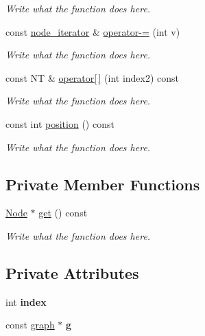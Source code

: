 \begin{DoxyCompactItemize}
\begin{DoxyCompactList}\small\item\em Write what the function does here. \end{DoxyCompactList}\item 
const \hyperlink{classgraph_1_1node__iterator}{node\+\_\+iterator} \& \hyperlink{classgraph_1_1node__iterator_af155e6e177ee131be5af6fed46133f03}{operator-\/=} (int v)
\begin{DoxyCompactList}\small\item\em Write what the function does here. \end{DoxyCompactList}\item 
const N\+T \& \hyperlink{classgraph_1_1node__iterator_ad725e0ed27e4bd369a42d5db8eabcc47}{operator\mbox{[}$\,$\mbox{]}} (int index2) const 
\begin{DoxyCompactList}\small\item\em Write what the function does here. \end{DoxyCompactList}\item 
const int \hyperlink{classgraph_1_1node__iterator_a51e4cfdb48a739751fbde6b9352703d2}{position} () const 
\begin{DoxyCompactList}\small\item\em Write what the function does here. \end{DoxyCompactList}\end{DoxyCompactItemize}
\subsection*{Private Member Functions}
\begin{DoxyCompactItemize}
\item 
\hyperlink{structgraph_1_1Node}{Node} $\ast$ \hyperlink{classgraph_1_1node__iterator_aac5a348f5d4079b0010238d91a9aaa12}{get} () const 
\begin{DoxyCompactList}\small\item\em Write what the function does here. \end{DoxyCompactList}\end{DoxyCompactItemize}
\subsection*{Private Attributes}
\begin{DoxyCompactItemize}
\item 
\hypertarget{classgraph_1_1node__iterator_acb4fc8365499193998c097adea839971}{int {\bfseries index}}\label{classgraph_1_1node__iterator_acb4fc8365499193998c097adea839971}

\item 
\hypertarget{classgraph_1_1node__iterator_a52d58638288d1a746c262b0ae3409301}{const \hyperlink{classgraph}{graph} $\ast$ {\bfseries g}}\label{classgraph_1_1node__iterator_a52d58638288d1a746c262b0ae3409301}

\end{DoxyCompactItemize}
